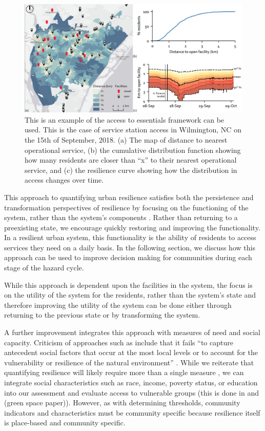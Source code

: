 \documentclass[9pt,twocolumn,twoside,lineno]{pnas-new}
\begin{document}
\begin{figure}
    \centering
    \includegraphics[width=\linewidth]{report/fig/Figure_1.png}
    \caption{This is an example of the access to essentials framework can be used. This is the case of service station access in Wilmington, NC on the 15th of September, 2018. (a) The map of distance to nearest operational service, (b) the cumulative distribution function showing how many residents are closer than “x” to their nearest operational service, and (c) the resilience curve showing how the distribution in access changes over time.
    }
    \label{fig:fig1}
\end{figure}

This approach to quantifying urban resilience satisfies both the persistence and transformation perspectives of resilience by focusing on the functioning of the system, rather than the system’s components \cite{Holling1997-rq}. Rather than returning to a preexisting state, we encourage quickly restoring and improving the functionality. In a resilient urban system, this functionality is the ability of residents to access services they need on a daily basis. In the following section, we discuss how this approach can be used to improve decision making for communities during each stage of the hazard cycle. 

While this approach is dependent upon the facilities in the system, the focus is on the utility of the system for the residents, rather than the system's state and therefore improving the utility of the system can be done either through returning to the previous state or by transforming the system. 




A further improvement integrates this approach with measures of need and social capacity. Criticism of approaches such as \cite{Bruneau2006-xc} include that it fails “to capture antecedent social factors that occur at the most local levels or to account for the vulnerability or resilience of the natural environment” \cite{Cutter2008-xv}. While we reiterate that quantifying resilience will likely require more than a single measure \cite{Levine2014-je}, we can integrate social characteristics such as race, income, poverty status, or education into our assessment and evaluate access to vulnerable groups (this is done in \cite{Logan2017-fr} and (green space paper)). However, as with determining thresholds, community indicators and characteristics must be community specific because resilience itself is place-based and community specific. 
\end{document}
